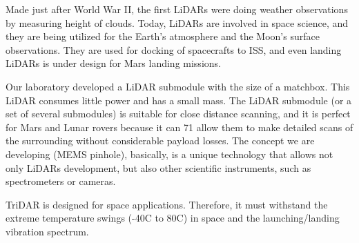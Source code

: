 Made just after World War II, the first LiDARs were doing weather observations by measuring
height of clouds. Today, LiDARs are involved in space science, and they are being utilized for the
Earth’s atmosphere and the Moon’s surface observations. They are used for docking of spacecrafts
to ISS, and even landing LiDARs is under design for Mars landing missions.

Our laboratory developed a LiDAR submodule with the size of a matchbox. This LiDAR
consumes little power and has a small mass. The LiDAR submodule (or a set of several submodules)
is suitable for close distance scanning, and it is perfect for Mars and Lunar rovers because it can
71
allow them to make detailed scans of the surrounding without considerable payload losses. The
concept we are developing (MEMS pinhole), basically, is a unique technology that allows not only
LiDARs development, but also other scientific instruments, such as spectrometers or cameras.
	



TriDAR is designed for space applications. Therefore, it must withstand the extreme temperature swings (-40C to
80C) in space and the launching/landing vibration spectrum.

